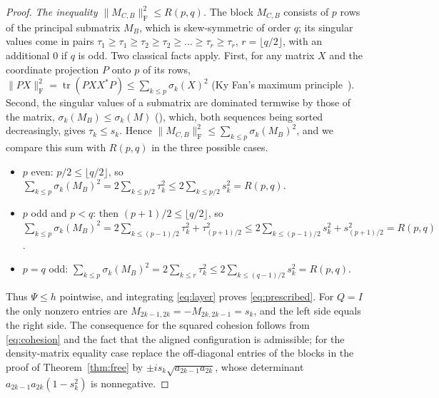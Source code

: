 \documentclass[11pt]{article}
\newcommand{\F}{\mathrm F}
\DeclareMathOperator{\tr}{tr}
\begin{document}
\begin{proof}
\emph{The inequality $\|M_{C,B}\|_\F^2\le R(p,q)$.} The block $M_{C,B}$
consists of $p$ rows of the principal submatrix $M_B$, which is
skew-symmetric of order $q$; its singular values come in pairs
$\tau_1\ge \tau_1\ge \tau_2\ge \tau_2\ge\dots\ge \tau_r\ge \tau_r$, $r=\lfloor q/2\rfloor$, with an
additional $0$ if $q$ is odd. Two classical facts apply. First, for any
matrix $X$ and the coordinate projection $P$ onto $p$ of its rows,
$\|PX\|_\F^2=\tr(PXX^*P)\le\sum_{k\le p}\sigma_k(X)^2$ (Ky Fan's maximum
principle~\cite{fan,bhatia}). Second, the singular values of a submatrix are
dominated termwise by those of the matrix, $\sigma_k(M_B)\le\sigma_k(M)$
(\cite[Thm.~3.1.2, Cor.~3.1.3]{hornjohnson}), which, both sequences being
sorted decreasingly, gives $\tau_k\le s_k$.
Hence $\|M_{C,B}\|_\F^2\le\sum_{k\le p}\sigma_k(M_B)^2$, and we compare this
sum with $R(p,q)$ in the three possible cases.
\begin{itemize}
\item $p$ even: $p/2\le\lfloor q/2\rfloor$, so
$\sum_{k\le p}\sigma_k(M_B)^2=2\sum_{k\le p/2}\tau_k^2\le2\sum_{k\le p/2}s_k^2=R(p,q)$.
\item $p$ odd and $p<q$: then $(p+1)/2\le\lfloor q/2\rfloor$, so
$\sum_{k\le p}\sigma_k(M_B)^2=2\sum_{k\le(p-1)/2}\tau_k^2+\tau_{(p+1)/2}^2
\le2\sum_{k\le(p-1)/2}s_k^2+s_{(p+1)/2}^2=R(p,q)$.
\item $p=q$ odd: $\sum_{k\le p}\sigma_k(M_B)^2=2\sum_{k\le r}\tau_k^2\le2\sum_{k\le(q-1)/2}s_k^2=R(p,q)$.
\end{itemize}
Thus $\Psi\le h$ pointwise, and integrating \eqref{eq:layer} proves
\eqref{eq:prescribed}. For $Q=I$ the only nonzero entries are
$M_{2k-1,2k}=-M_{2k,2k-1}=s_k$, and the left side equals the right side.
The consequence for the squared cohesion follows from \eqref{eq:cohesion} and
the fact that the aligned configuration is admissible; for the density-matrix
equality case replace the off-diagonal entries of the blocks in the proof of
Theorem~\ref{thm:free} by $\pm is_k\sqrt{a_{2k-1}a_{2k}}$, whose determinant
$a_{2k-1}a_{2k}(1-s_k^2)$ is nonnegative.
\end{proof}
\end{document}

